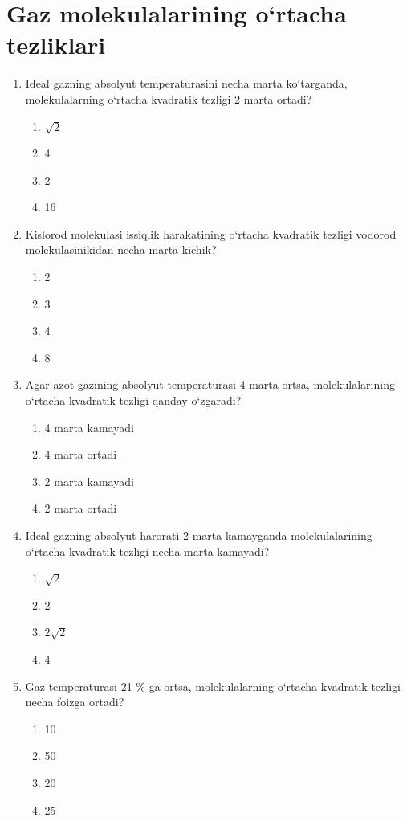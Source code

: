 
\section{Gaz molekulalarining o`rtacha tezliklari}

\begin{enumerate}

\item Ideal gazning absolyut temperaturasini necha marta ko‘targanda, molekulalarning o‘rtacha kvadratik tezligi 2 marta ortadi?
\begin{enumerate}[label=\Alph*)]
\item $\sqrt{2}$
\item 4
\item 2
\item 16
\end{enumerate}

\item Kislorod molekulasi issiqlik harakatining o‘rtacha kvadratik tezligi vodorod molekulasinikidan necha marta kichik?
\begin{enumerate}[label=\Alph*)]
\item 2
\item 3
\item 4
\item 8
\end{enumerate}

\item Agar azot gazining absolyut temperaturasi 4 marta ortsa, molekulalarining o‘rtacha kvadratik tezligi qanday o‘zgaradi?
\begin{enumerate}[label=\Alph*)]
\item 4 marta kamayadi
\item 4 marta ortadi
\item 2 marta kamayadi
\item 2 marta ortadi
\end{enumerate}

\item Ideal gazning absolyut harorati 2 marta kamayganda molekulalarining o‘rtacha kvadratik tezligi necha marta kamayadi?
\begin{enumerate}[label=\Alph*)]
\item $\sqrt{2}$
\item 2
\item $2\sqrt{2}$
\item 4
\end{enumerate}

\item Gaz temperaturasi 21 \% ga ortsa, molekulalarning o‘rtacha kvadratik tezligi necha foizga ortadi?
\begin{enumerate}[label=\Alph*)]
\item 10
\item 50
\item 20
\item 25
\end{enumerate}


\end{enumerate}
